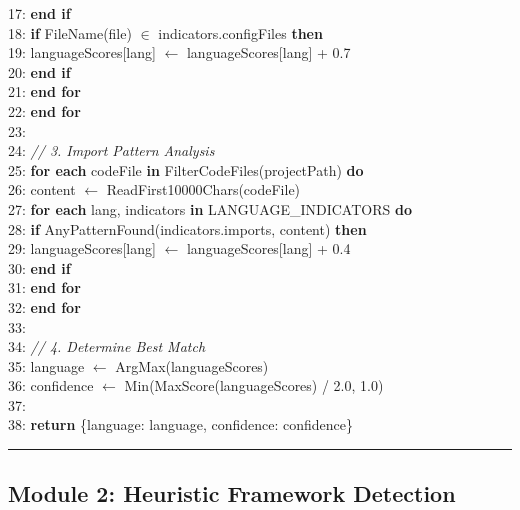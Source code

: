 17: \hspace{1cm}\textbf{end if}\\
18: \hspace{1cm}\textbf{if} FileName(file) $\in$ indicators.configFiles \textbf{then}\\
19: \hspace{1.5cm}languageScores[lang] $\leftarrow$ languageScores[lang] + 0.7\\
20: \hspace{1cm}\textbf{end if}\\
21: \hspace{0.5cm}\textbf{end for}\\
22: \textbf{end for}\\
23:\\
24: \textit{// 3. Import Pattern Analysis}\\
25: \textbf{for each} codeFile \textbf{in} FilterCodeFiles(projectPath) \textbf{do}\\
26: \hspace{0.5cm}content $\leftarrow$ ReadFirst10000Chars(codeFile)\\
27: \hspace{0.5cm}\textbf{for each} lang, indicators \textbf{in} LANGUAGE\_INDICATORS \textbf{do}\\
28: \hspace{1cm}\textbf{if} AnyPatternFound(indicators.imports, content) \textbf{then}\\
29: \hspace{1.5cm}languageScores[lang] $\leftarrow$ languageScores[lang] + 0.4\\
30: \hspace{1cm}\textbf{end if}\\
31: \hspace{0.5cm}\textbf{end for}\\
32: \textbf{end for}\\
33:\\
34: \textit{// 4. Determine Best Match}\\
35: language $\leftarrow$ ArgMax(languageScores)\\
36: confidence $\leftarrow$ Min(MaxScore(languageScores) / 2.0, 1.0)\\
37:\\
38: \textbf{return} \{language: language, confidence: confidence\}\\
\noindent\rule{\textwidth}{0.4pt}

\subsection{Module 2: Heuristic Framework Detection}

